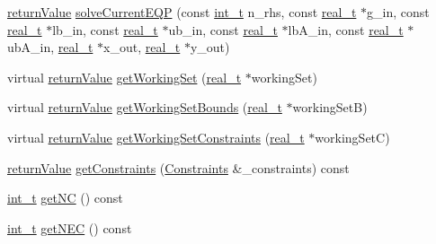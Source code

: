 \begin{DoxyCompactItemize}
\item 
\hyperlink{_message_handling_8hpp_a81d556f613bfbabd0b1f9488c0fa865e}{return\+Value} \hyperlink{class_q_problem_a41c193e651a37e84e8b3eec0d5c44f46}{solve\+Current\+E\+QP} (const \hyperlink{_types_8hpp_ab6fd6105e64ed14a0c9281326f05e623}{int\+\_\+t} n\+\_\+rhs, const \hyperlink{qp_o_a_s_e_s__wrapper_8h_a0d00e2b3dfadee81331bbb39068570c4}{real\+\_\+t} $\ast$g\+\_\+in, const \hyperlink{qp_o_a_s_e_s__wrapper_8h_a0d00e2b3dfadee81331bbb39068570c4}{real\+\_\+t} $\ast$lb\+\_\+in, const \hyperlink{qp_o_a_s_e_s__wrapper_8h_a0d00e2b3dfadee81331bbb39068570c4}{real\+\_\+t} $\ast$ub\+\_\+in, const \hyperlink{qp_o_a_s_e_s__wrapper_8h_a0d00e2b3dfadee81331bbb39068570c4}{real\+\_\+t} $\ast$lb\+A\+\_\+in, const \hyperlink{qp_o_a_s_e_s__wrapper_8h_a0d00e2b3dfadee81331bbb39068570c4}{real\+\_\+t} $\ast$ub\+A\+\_\+in, \hyperlink{qp_o_a_s_e_s__wrapper_8h_a0d00e2b3dfadee81331bbb39068570c4}{real\+\_\+t} $\ast$x\+\_\+out, \hyperlink{qp_o_a_s_e_s__wrapper_8h_a0d00e2b3dfadee81331bbb39068570c4}{real\+\_\+t} $\ast$y\+\_\+out)
\item 
virtual \hyperlink{_message_handling_8hpp_a81d556f613bfbabd0b1f9488c0fa865e}{return\+Value} \hyperlink{class_q_problem_a133ed005f9da3dd7dc45159b1fdc9d2d}{get\+Working\+Set} (\hyperlink{qp_o_a_s_e_s__wrapper_8h_a0d00e2b3dfadee81331bbb39068570c4}{real\+\_\+t} $\ast$working\+Set)
\item 
virtual \hyperlink{_message_handling_8hpp_a81d556f613bfbabd0b1f9488c0fa865e}{return\+Value} \hyperlink{class_q_problem_a23949497794759135cd63d2bc5dc297a}{get\+Working\+Set\+Bounds} (\hyperlink{qp_o_a_s_e_s__wrapper_8h_a0d00e2b3dfadee81331bbb39068570c4}{real\+\_\+t} $\ast$working\+SetB)
\item 
virtual \hyperlink{_message_handling_8hpp_a81d556f613bfbabd0b1f9488c0fa865e}{return\+Value} \hyperlink{class_q_problem_a9aff2accd586086d0a3113eba9b73678}{get\+Working\+Set\+Constraints} (\hyperlink{qp_o_a_s_e_s__wrapper_8h_a0d00e2b3dfadee81331bbb39068570c4}{real\+\_\+t} $\ast$working\+SetC)
\item 
\hyperlink{_message_handling_8hpp_a81d556f613bfbabd0b1f9488c0fa865e}{return\+Value} \hyperlink{class_q_problem_abe03fce110b5617bce363066b80020a5}{get\+Constraints} (\hyperlink{class_constraints}{Constraints} \&\+\_\+constraints) const
\item 
\hyperlink{_types_8hpp_ab6fd6105e64ed14a0c9281326f05e623}{int\+\_\+t} \hyperlink{class_q_problem_aaf9795d583672369b886e9deb683b506}{get\+NC} () const
\item 
\hyperlink{_types_8hpp_ab6fd6105e64ed14a0c9281326f05e623}{int\+\_\+t} \hyperlink{class_q_problem_a4dfed2d15c76d5d6b3d904feb1d081c4}{get\+N\+EC} () const

\end{DoxyCompactItemize}
